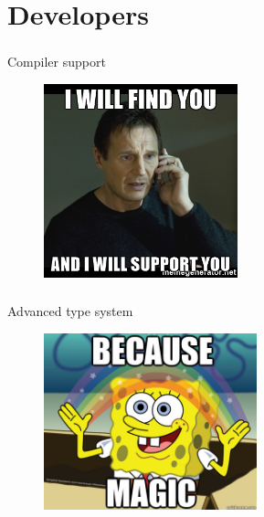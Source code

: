 \documentclass[usenames,dvipsnames, 18pt, compress, aspectratio=169]{beamer}
\begin{document}
\fontsize{13pt}{14}\selectfont
\section{Developers}
\fontsize{17pt}{18}\selectfont

\fontsize{17pt}{19}\selectfont
\begin{frame}
    \frametitle{}
    \begin{center}
    Compiler support

    \begin{figure}
        \includegraphics[width=0.5\textwidth,center]{i-will-find-you-and-i-will-support-you.jpg}
    \end{figure}

    \end{center}
\end{frame}

\begin{frame}
    \frametitle{}
    \begin{center}
    Advanced type system

    \begin{figure}
        \includegraphics[width=0.55\textwidth,center]{magic.jpg}
    \end{figure}

    \end{center}
\end{frame}
\end{document}
